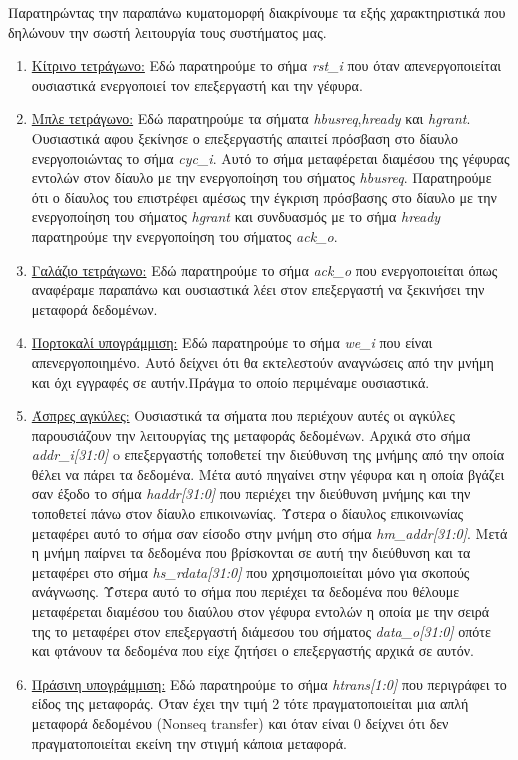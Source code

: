 \documentclass[a4paper,10pt]{article}
\numberwithin{figure}{section}
\numberwithin{table}{section}
\begin{document}
\newpage
\vspace{0.7cm}
\vspace{0.7cm}
Παρατηρώντας την παραπάνω κυματομορφή διακρίνουμε τα εξής χαρακτηριστικά που δηλώνουν την σωστή λειτουργία τους συστήματος μας.
\begin{enumerate}
 \item \underline{Κίτρινο τετράγωνο:} Εδώ παρατηρούμε το σήμα \emph{rst\_i} που όταν απενεργοποιείται ουσιαστικά ενεργοποιεί τον επεξεργαστή και την γέφυρα.
 \item \underline{Μπλε τετράγωνο:} Εδώ παρατηρούμε τα σήματα \emph{hbusreq},\emph{hready} και \emph{hgrant}. Ουσιαστικά αφου ξεκίνησε ο επεξεργαστής απαιτεί πρόσβαση στο δίαυλο
ενεργοποιώντας το σήμα \emph{cyc\_i}. Αυτό το σήμα μεταφέρεται διαμέσου της γέφυρας εντολών στον δίαυλο με την ενεργοποίηση του σήματος \emph{hbusreq}. Παρατηρούμε ότι ο δίαυλος του επιστρέφει αμέσως την έγκριση πρόσβασης στο δίαυλο με την ενεργοποίηση του σήματος \emph{hgrant} και συνδυασμός με το σήμα \emph{hready} παρατηρούμε την ενεργοποίηση του σήματος \emph{ack\_o}.
 \item \underline{Γαλάζιο τετράγωνο:} Εδώ παρατηρούμε το σήμα \emph{ack\_o} που ενεργοποιείται όπως αναφέραμε παραπάνω και ουσιαστικά λέει στον επεξεργαστή να ξεκινήσει την μεταφορά δεδομένων.
 \item \underline{Πορτοκαλί υπογράμμιση:} Εδώ παρατηρούμε το σήμα \emph{we\_i} που είναι απενεργοποιημένο. Αυτό δείχνει ότι θα εκτελεστούν αναγνώσεις από την μνήμη και όχι εγγραφές σε αυτήν.Πράγμα το οποίο περιμέναμε ουσιαστικά.
 \item \underline{Άσπρες αγκύλες:} Ουσιαστικά τα σήματα που περιέχουν αυτές οι αγκύλες παρουσιάζουν την λειτουργίας της μεταφοράς δεδομένων. Αρχικά στο σήμα \emph{addr\_i[31:0]} o επεξεργαστής τοποθετεί την διεύθυνση της μνήμης από την οποία θέλει να πάρει τα δεδομένα. Μέτα αυτό πηγαίνει στην γέφυρα και η οποία βγάζει σαν έξοδο το σήμα \emph{haddr[31:0]} που περιέχει την διεύθυνση μνήμης και την τοποθετεί πάνω στον δίαυλο επικοινωνίας. Ύστερα ο δίαυλος επικοινωνίας μεταφέρει αυτό το σήμα σαν είσοδο στην μνήμη στο σήμα \emph{hm\_addr[31:0]}. Μετά η μνήμη παίρνει τα δεδομένα που βρίσκονται σε αυτή την διεύθυνση και τα μεταφέρει στο σήμα \emph{hs\_rdata[31:0]} που χρησιμοποιείται μόνο για σκοπούς ανάγνωσης. Ύστερα αυτό το σήμα που περιέχει τα δεδομένα που θέλουμε μεταφέρεται διαμέσου του διαύλου στον γέφυρα εντολών η οποία με την σειρά της το μεταφέρει στον επεξεργαστή διάμεσου του σήματος \emph{data\_o[31:0]} οπότε και φτάνουν τα δεδομένα που είχε ζητήσει ο επεξεργαστής αρχικά σε αυτόν.
 \item \underline{Πράσινη υπογράμμιση:} Εδώ παρατηρούμε το σήμα \emph{htrans[1:0]} που περιγράφει το είδος της μεταφοράς. Όταν έχει την τιμή 2 τότε πραγματοποιείται μια απλή μεταφορά δεδομένου (Nonseq transfer) και όταν είναι 0 δείχνει ότι δεν πραγματοποιείται εκείνη την στιγμή κάποια μεταφορά.
\end{enumerate}
\end{document}
